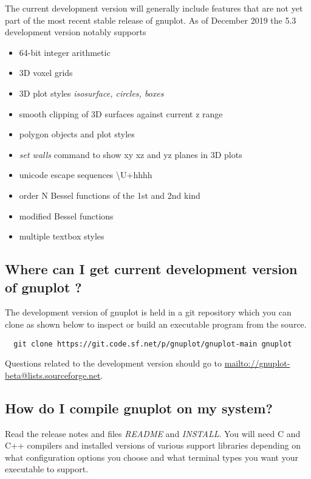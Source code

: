 \documentclass[a4paper,11pt]{article}
\def\mailto#1{{\small\href{mailto://#1}{\url{mailto://#1}}}}
\newcommand{\mailto}[1]%
            {\htmladdnormallink{\latex{\url{<#1>}}\html{\textit{#1}}}%
                {mailto:#1}%
            }
\newcommand{\gnuplot}{\textbf{gnuplot }}
\begin{document}
The current development version will generally include features that are
not yet part of the most recent stable release of gnuplot.
As of December 2019 the 5.3 development version notably supports
\begin{itemize}{}{}
\setlength\itemsep{-4pt}
\item 64-bit integer arithmetic
\item 3D voxel grids
\item 3D plot styles {\em isosurface, circles, boxes}
\item smooth clipping of 3D surfaces against current z range
\item polygon objects and plot styles
\item {\em set walls} command to show xy xz and yz planes in 3D plots
\item unicode escape sequences {\textbackslash}U+hhhh
\item order N Bessel functions of the 1st and 2nd kind
\item modified Bessel functions
\item multiple textbox styles
\end{itemize}

\subsection{Where can I get current development version of \gnuplot?}

The development version of gnuplot is held in a git repository which you
can clone as shown below to inspect or build an executable program
from the source.

\scriptsize
\begin{verbatim}
  git clone https://git.code.sf.net/p/gnuplot/gnuplot-main gnuplot
\end{verbatim}
\normalsize

Questions related to the development version should go to
\mailto{gnuplot-beta@lists.sourceforge.net}.


\subsection{How do I compile \gnuplot on my system?}

Read the release notes and files \textit{README} and \textit{INSTALL}.
You will need C and C++ compilers and installed versions of various
support libraries depending on what configuration options you choose and what
terminal types you want your executable to support.
\end{document}
